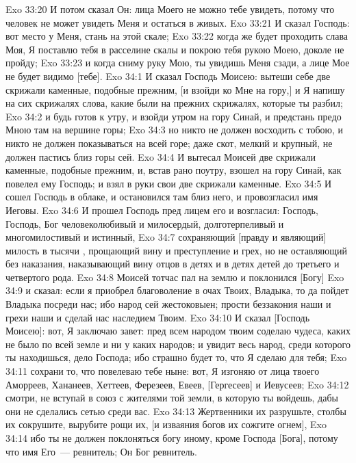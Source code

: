 \vs Exo 33:20 И потом сказал Он: лица Моего не можно тебе увидеть, потому что человек не может увидеть Меня и остаться в живых.
\vs Exo 33:21 И сказал Господь: вот место у Меня, стань на этой скале;
\vs Exo 33:22 когда же будет проходить слава Моя, Я поставлю тебя в расселине скалы и покрою тебя рукою Моею, доколе не пройду;
\vs Exo 33:23 и когда сниму руку Мою, ты увидишь Меня сзади, а лице Мое не будет видимо [тебе].
\vs Exo 34:1 И сказал Господь Моисею: вытеши себе две скрижали каменные, подобные прежним, [и взойди ко Мне на гору,] и Я напишу на сих скрижалях слова, какие были на прежних скрижалях, которые ты разбил;
\vs Exo 34:2 и будь готов к утру, и взойди утром на гору Синай, и предстань предо Мною там на вершине горы;
\vs Exo 34:3 но никто не должен восходить с тобою, и никто не должен показываться на всей горе; даже скот, мелкий и крупный, не должен пастись близ горы сей.
\rsbpar\vs Exo 34:4 И вытесал Моисей две скрижали каменные, подобные прежним, и, встав рано поутру, взошел на гору Синай, как повелел ему Господь; и взял в руки свои две скрижали каменные.
\vs Exo 34:5 И сошел Господь в облаке, и остановился там близ него, и провозгласил имя Иеговы.
\vs Exo 34:6 И прошел Господь пред лицем его и возгласил: Господь, Господь, Бог человеколюбивый и милосердый, долготерпеливый и многомилостивый и истинный,
\vs Exo 34:7 сохраняющий [правду и являющий] милость в тысячи , прощающий вину и преступление и грех, но не оставляющий без наказания, наказывающий вину отцов в детях и в детях детей до третьего и четвертого рода.
\vs Exo 34:8 Моисей тотчас пал на землю и поклонился [Богу]
\vs Exo 34:9 и сказал: если я приобрел благоволение в очах Твоих, Владыка, то да пойдет Владыка посреди нас; ибо народ сей жестоковыен; прости беззакония наши и грехи наши и сделай нас наследием Твоим.
\vs Exo 34:10 И сказал [Господь Моисею]: вот, Я заключаю завет: пред всем народом твоим соделаю чудеса, каких не было по всей земле и ни у каких народов; и увидит весь народ, среди которого ты находишься, дело Господа; ибо страшно будет то, что Я сделаю для тебя;
\vs Exo 34:11 сохрани то, что повелеваю тебе ныне: вот, Я изгоняю от лица твоего Аморреев, Хананеев, Хеттеев, Ферезеев, Евеев, [Гергесеев] и Иевусеев;
\vs Exo 34:12 смотри, не вступай в союз с жителями той земли, в которую ты войдешь, дабы они не сделались сетью среди вас.
\vs Exo 34:13 Жертвенники их разрушьте, столбы их сокрушите, вырубите  рощи их, [и изваяния богов их сожгите огнем],
\vs Exo 34:14 ибо ты не должен поклоняться богу иному, кроме Господа [Бога], потому что имя Его~--- ревнитель; Он Бог ревнитель.
